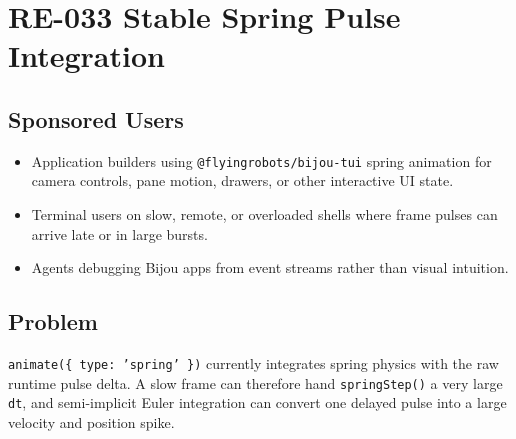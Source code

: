 \chapter{RE-033 Stable Spring Pulse Integration}\label{record-161}

\smallskip

\section{Sponsored Users}\label{record-161-sponsored-users}

\begin{itemize}
\tightlist
\item
  Application builders using \texttt{@\allowbreak{}f\allowbreak{}l\allowbreak{}y\allowbreak{}i\allowbreak{}n\allowbreak{}g\allowbreak{}r\allowbreak{}o\allowbreak{}b\allowbreak{}o\allowbreak{}t\allowbreak{}s\allowbreak{}/\allowbreak{}b\allowbreak{}i\allowbreak{}j\allowbreak{}o\allowbreak{}u\allowbreak{}-\allowbreak{}t\allowbreak{}u\allowbreak{}i} spring animation for camera controls, pane motion, drawers, or other interactive UI state.
\item
  Terminal users on slow, remote, or overloaded shells where frame pulses can arrive late or in large bursts.
\item
  Agents debugging Bijou apps from event streams rather than visual intuition.
\end{itemize}

\section{Problem}\label{record-161-problem}

\texttt{a\allowbreak{}n\allowbreak{}i\allowbreak{}m\allowbreak{}a\allowbreak{}t\allowbreak{}e\allowbreak{}(\allowbreak{}\{\allowbreak{} \allowbreak{}t\allowbreak{}y\allowbreak{}p\allowbreak{}e\allowbreak{}:\allowbreak{} \allowbreak{}'\allowbreak{}s\allowbreak{}p\allowbreak{}r\allowbreak{}i\allowbreak{}n\allowbreak{}g\allowbreak{}'\allowbreak{} \allowbreak{}\}\allowbreak{})} currently integrates spring physics with the raw runtime pulse delta. A slow frame can therefore hand \texttt{s\allowbreak{}p\allowbreak{}r\allowbreak{}i\allowbreak{}n\allowbreak{}g\allowbreak{}S\allowbreak{}t\allowbreak{}e\allowbreak{}p\allowbreak{}(\allowbreak{})} a very large \texttt{d\allowbreak{}t}, and semi-implicit Euler integration can convert one delayed pulse into a large velocity and position spike.

